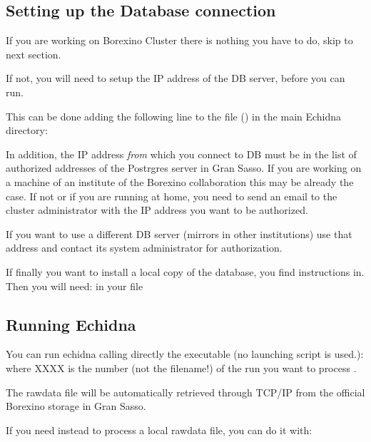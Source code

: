 \subsection{Setting up the Database connection}
\label{sec:run_db}

If you are working on Borexino Cluster there is nothing you have to do, skip to next section.

If not, you will need to setup the IP address of the DB server, before you can run.

This can be done adding the following line to the file  () in the main Echidna directory:

In addition, the IP address \emph{from}  which you connect to DB must be in the list of authorized addresses of the Postrgres server in Gran Sasso.
If you are working on a machine of an institute of the Borexino collaboration this may be already the case.
If not or if you are running at home, you need to send an email to the cluster administrator with the IP address you want to be authorized.

If you want to use a different DB server (mirrors in other institutions) use that address and contact its system administrator for authorization.

If finally you want to install a local copy of the database, you find instructions in\cite{???}.
Then you will need:
in your  file


\subsection{Running Echidna}
\label{sec:run_run}

You can run echidna calling directly the executable (no launching script is used.):
where XXXX is the number (not the filename!) of the run you want to process .

The rawdata file will be automatically retrieved through TCP/IP from the official Borexino storage in Gran Sasso.

If you need instead to process a local rawdata file, you can do it with:

